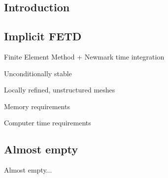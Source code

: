 \begin{slide}

\part{Introduction}
\chapter{Implicit FETD}

Finite Element Method + Newmark time integration



\bigskip

\begin{slideitemize}

\renewcommand{\slideitem}{\itempos}

\item Unconditionally stable

\smallskip

\item Locally refined, unstructured meshes

\medskip

\renewcommand{\slideitem}{\itemneg}

\item Memory requirements

\smallskip

\item Computer time requirements

\end{slideitemize}

\end{slide}


\begin{slide}

\chapter{Almost empty}

Almost empty...

\end{slide}




